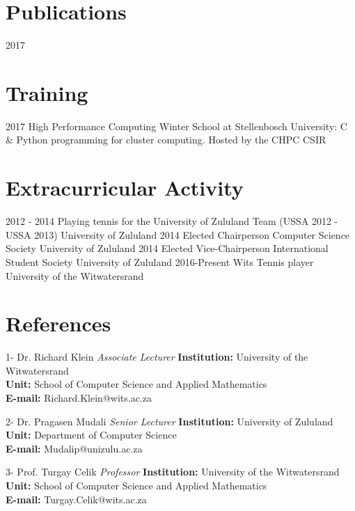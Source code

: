 \documentclass[letterpaper]{moderncv}        %
\begin{document}
	
\section{Publications}
\cventry
{2017}
{}
{}
{}
{\textit{}}
{}

\section{Training}
\cventry
{2017}
{High Performance Computing Winter School at Stellenbosch University: C \& Python programming for cluster computing.}
{Hosted by the CHPC}
{CSIR}
{\textit{}}
{}
				
\section{Extracurricular Activity}
\cventry
{2012 - 2014}
{Playing tennis for the University of Zululand Team (USSA 2012 - USSA 2013)}
{University of Zululand}
{}
{\textit{}}
{}
\cventry
{2014}
{Elected Chairperson Computer Science Society}
{University of Zululand}
{}
{\textit{}}
{}
\cventry
{2014}
{Elected Vice-Chairperson International Student Society}
{University of Zululand}
{}
{\textit{}}
{}	
\cventry
{2016-Present}
{Wits Tennis player}
{University of the Witwatersrand}
{}
{\textit{}}
{}

\section{References}
\cventry
{1-}
{Dr. Richard Klein}
{}
{\textit{Associate Lecturer}}
{}
{\textbf{Institution:} University of the Witwatersrand\\
	\textbf{Unit:} School of Computer Science and Applied Mathematics\\
	\textbf{E-mail:} Richard.Klein@wits.ac.za}
\vspace{1mm}

\cventry
{2-}
{Dr. Pragasen Mudali}
{}
{\textit{Senior Lecturer}}
{}
{\textbf{Institution:} University of Zululand\\
	\textbf{Unit:} Department of Computer Science\\
	\textbf{E-mail:} Mudalip@unizulu.ac.za}
\vspace{1mm}

\cventry
{3-}
{Prof. Turgay Celik}
{}
{\textit{Professor}}
{}
{\textbf{Institution:} University of the Witwatersrand\\
	\textbf{Unit:} School of Computer Science and Applied Mathematics\\
	\textbf{E-mail:} Turgay.Celik@wits.ac.za}
\vspace{1mm}
\end{document}

